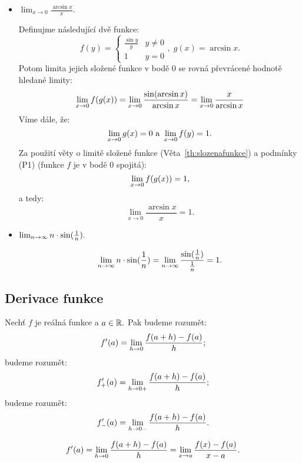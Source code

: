 \begin{remark}
    \leavevmode
    \begin{itemize}
        \item $\lim_{x \to 0} \frac{\arcsin x}{x}.$

            Definujme následující dvě funkce:
            $$f(y) = \begin{cases}
                \frac{\sin y}{y} &y \neq 0 \\
                1 &y = 0
            \end{cases}, \; g(x) = \arcsin x.$$
            Potom limita jejich složené funkce v bodě $0$ se rovná převrácené
            hodnotě hledané limity:
            $$\lim_{x \to 0} f(g(x)) = \lim_{x \to 0} \frac{\sin(\arcsin x)}{\arcsin x} 
            = \lim_{x \to 0} \frac{x}{\arcsin x}$$
            Víme dále, že:
            $$\lim_{x \to 0} g(x) = 0 \text{ a } \lim_{x \to 0} f(y) = 1.$$
            Za použití věty o limitě složené funkce (Věta~\ref{th:slozenafunkce})
            a podmínky (P1) (funkce $f$ je v bodě $0$ spojitá):
            $$\lim_{x \to 0} f(g(x)) = 1,$$
            a tedy:
            $$\lim_{x \to 0} \frac{\arcsin x}{x} = 1.$$

        \item $\lim_{n\to\infty} n\cdot\sin(\frac{1}{n}).$

            $$\lim_{n\to\infty} n\cdot\sin(\frac{1}{n}) = \lim_{n\to\infty}
            \frac{\sin(\frac{1}{n})}{\frac{1}{n}} = 1.$$
    \end{itemize}
\end{remark}

\subsection{Derivace funkce}

\begin{definition}
    Nechť $f$ je reálná funkce a $a \in \mathbb{R}.$ Pak 
    budeme rozumět:
    $$f'(a) = \lim_{h \to 0} \frac{f(a+h) - f(a)}{h};$$
     budeme rozumět:
    $$f_+'(a) = \lim_{h \to 0+} \frac{f(a+h) - f(a)}{h};$$
     budeme rozumět:
    $$f_-'(a) = \lim_{h \to 0-} \frac{f(a+h) - f(a)}{h}.$$
\end{definition}

\begin{remark}
    $$f'(a) = \lim_{h \to 0} \frac{f(a+h) - f(a)}{h} = \lim_{x \to a} \frac{f(x) - f(a)}{x-a}.$$
\end{remark}

